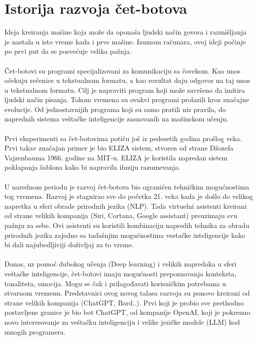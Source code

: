 \documentclass[fleqn, 12pt]{article}
\begin{document}


\setcounter{tocdepth}{2}
\tableofcontents

\newpage

\section{Istorija razvoja čet-botova}
\begin{text}
Ideja kreiranja mašine koja može da oponaša ljudski način govora i razmišljanja je nastala u isto vreme kada i prve mašine. Izumom računara, ovoj ideji počinje po prvi put da se posvećuje velika pažnja\cite{G1}.
\\\\
Čet-botovi su programi specijalizovani za komunikaciju sa čovekom. Kao unos očekuju rečenice u tekstualnom formatu, a kao rezultat daju odgovor na taj unos u tekstualnom formatu. Cilj je napraviti program koji može savršeno da imitira ljudski način pisanja. Tokom vremena su ovakvi programi prolazili kroz značajne evolucije. Od jednostavnijih programa koji su samo pratili niz pravila, do naprednih sistema veštačke inteligencije zasnovanih na mašinskom učenju\cite{G1}.
\\\\
Prvi eksperimenti sa čet-botovima potiču još iz pedesetih godina prošlog veka. Prvi takav značajan primer je bio ELIZA sistem, stvoren od strane Džozefa Vajzenbauma 1966. godine na MIT-u. ELIZA je koristila napredan sistem poklapanja šablona kako bi napravila iluziju razumevanja\cite{G1, G2, G3}.
\\\\
U narednom periodu je razvoj čet-botova bio ograničen tehničkim mogućnostima tog vremena. Razvoj je stagnirao sve do početka 21. veka kada je došlo do velikog napretka u sferi obrade prirodnih jezika (NLP). Tada virtuelni asistenti kreirani od strane velikih kompanija (Siri, Cortana, Google assistant) preuzimaju svu pažnju za sebe. Ovi asistenti su koristili kombinaciju napredih tehnika za obradu prirodnih jezika zajedno sa tadašnjim mogućnostima vestačke inteligencije kako bi dali najubedljiviji doživljaj za to vreme\cite{G1}.
\\\\
Danas, uz pomoć dubokog učenja (Deep learning) i velikih napredaka u sferi veštačke inteligencije, čet-botovi imaju mogućnosti prepoznavanja konteksta, tonaliteta, emocija. Mogu se čak i prilagođavati korisničkim potrebama u stvarnom vremenu. Predstavnici ovog novog talasa razvoja su ponovo kreirani od strane velikih kompanija (ChatGPT, Bard..). Prvi koji je probio sve prethodno postavljene granice je bio bot ChatGPT, od kompanije OpenAI, koji je pokrenuo novo interesovanje za veštačku inteligenciju i velike jezičke modele (LLM) kod mnogih programera\cite{G1}.
\end{text}
\newpage
\end{document}
